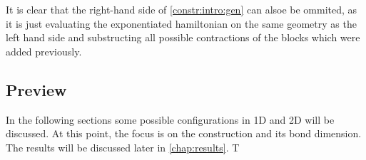 It is clear that the right-hand side of \cref{constr:intro:gen} can alsoe be ommited, as it is just evaluating the exponentiated hamiltonian on the same geometry as the left hand side and substructing all possible contractions of the blocks which were added previously.

\subsection{Preview}

In the following sections some possible configurations in 1D and 2D will be discussed. At this point, the focus is on the construction and its bond dimension. The results will be discussed later in \cref{chap:results}. T